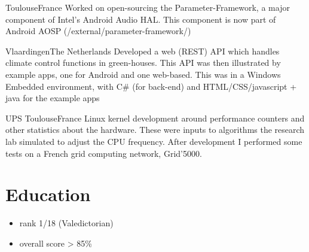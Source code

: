 \documentclass[a4paper,11pt,sans]{moderncv}
\begin{document}
{Toulouse}{France}
{
  Worked on open-sourcing the Parameter-Framework, a major component of Intel's Android Audio HAL.
  This component is now part of Android AOSP (/external/parameter-framework/)
}

{Vlaardingen}{The Netherlands}
{
  Developed a web (REST) API which handles climate control functions in green-houses.
  This API was then illustrated by example apps, one for Android and one web-based.
  This was in a Windows Embedded environment, with C\# (for back-end) and HTML/CSS/javascript + java for the example apps
}

{UPS Toulouse}{France}
{
  Linux kernel development around performance counters and other statistics about the hardware.
  These were inputs to algorithms the research lab simulated to adjust the CPU frequency.
  After development I performed some tests on a French grid computing network, Grid'5000.
}


\section{Education}
{
  \begin{itemize}
  \item rank 1/18 (Valedictorian)
  \item overall score > 85\%
  \end{itemize}
}
\end{document}
